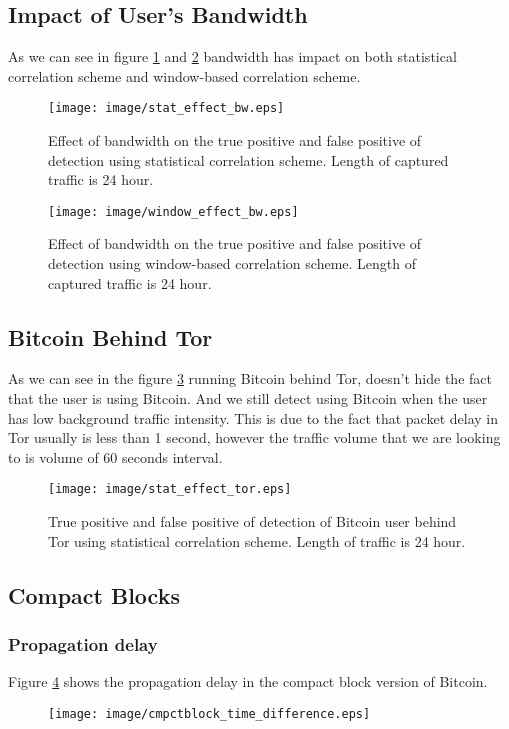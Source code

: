\subsection{Impact of User's Bandwidth}
As we can see in figure \ref{fig:stat_effect_bw} and \ref{fig:window_effect_bw} bandwidth has impact on both statistical correlation scheme and window-based correlation scheme. 
\begin{figure}
\centering
\texttt{[image: image/stat\_effect\_bw.eps]}
\caption{Effect of bandwidth on the true positive and false positive of detection using statistical correlation scheme. Length of captured traffic is 24 hour.}
\label{fig:stat_effect_bw}
\end{figure}

\begin{figure}
\centering
\texttt{[image: image/window\_effect\_bw.eps]}
\caption{Effect of bandwidth on the true positive and false positive of detection using  window-based correlation scheme. Length of captured traffic is 24 hour.}
\label{fig:window_effect_bw}
\end{figure}

\subsection{Bitcoin Behind Tor}
As we can see in the figure \ref{fig:stat_effect_tor} running Bitcoin behind Tor, doesn't hide the fact that the user is using Bitcoin. And we still detect using Bitcoin when the user has low background traffic intensity. This is due to the fact that packet delay in Tor usually is less than 1 second, however the traffic volume that we are looking to is volume of 60 seconds interval. 
\begin{figure}
\centering
\texttt{[image: image/stat\_effect\_tor.eps]}
\caption{True positive and false positive of detection of Bitcoin user behind Tor using statistical correlation scheme. Length of traffic is 24 hour.}
\label{fig:stat_effect_tor}
\end{figure}

\subsection{Compact Blocks}\label{sec:compactblock}
\subsubsection{Propagation delay}
Figure \ref{fig:cmpctblock_time_difference} shows the propagation delay in the compact block version of Bitcoin. 
\begin{figure}
\centering
\texttt{[image: image/cmpctblock\_time\_difference.eps]}
\caption{}
\label{fig:cmpctblock_time_difference}
\end{figure}
